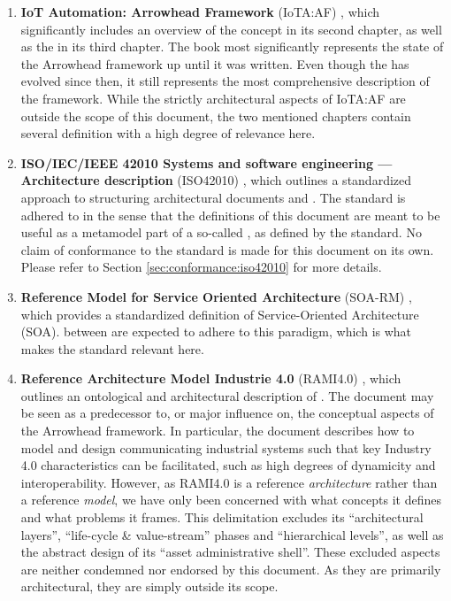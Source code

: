 \begin{enumerate}

\item \textbf{IoT Automation: Arrowhead Framework} (IoTA:AF) \cite{delsing2017iot}, which significantly includes an overview of the  concept in its second chapter, as well as the \textit{ } in its third chapter.
The book most significantly represents the state of the Arrowhead framework up until it was written.
Even though the  has evolved since then, it still represents the most comprehensive description of the framework.
While the strictly architectural aspects of IoTA:AF are outside the scope of this document, the two mentioned chapters contain several definition with a high degree of relevance here.

\item \textbf{ISO/IEC/IEEE 42010 Systems and software engineering — Architecture description} (ISO42010) \cite{iso42010}, which outlines a standardized approach to structuring architectural documents and .
The standard is adhered to in the sense that the definitions of this document are meant to be useful as a metamodel part of a so-called , as defined by the standard.
No claim of conformance to the standard is made for this document on its own.
Please refer to Section \ref{sec:conformance:iso42010} for more details.

\item \textbf{Reference Model for Service Oriented Architecture} (SOA-RM) \cite{mackenzie2006reference}, which provides a standardized definition of Service-Oriented Architecture (SOA).
 between   are expected to adhere to this paradigm, which is what makes the standard relevant here.

\item \textbf{Reference Architecture Model Industrie 4.0} (RAMI4.0) \cite{adolphs2016reference}, which outlines an ontological and architectural description of .
The document may be seen as a predecessor to, or major influence on, the conceptual aspects of the Arrowhead framework.
In particular, the document describes how to model and design communicating industrial systems such that key Industry 4.0 characteristics can be facilitated, such as high degrees of dynamicity and interoperability.
However, as RAMI4.0 is a reference \textit{architecture} rather than a reference \textit{model}, we have only been concerned with what concepts it defines and what problems it frames.
This delimitation excludes its ``architectural layers'', ``life-cycle \& value-stream'' phases and ``hierarchical levels'', as well as the abstract design of its ``asset administrative shell''.
These excluded aspects are neither condemned nor endorsed by this document.
As they are primarily architectural, they are simply outside its scope.


\end{enumerate}
